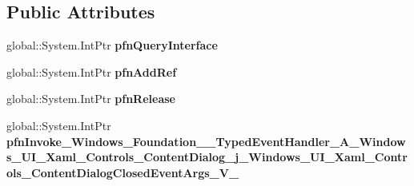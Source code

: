 \subsection*{Public Attributes}
\begin{DoxyCompactItemize}
\item 
\mbox{\label{struct_windows_1_1_foundation_1_1_typed_event_handler___a___windows___u_i___xaml___controls___co7a2cb13f58867dd2ebe18aa3ab56ee61_a63d3bc9447dea6fc4658a59597adfc0b}} 
global\+::\+System.\+Int\+Ptr {\bfseries pfn\+Query\+Interface}
\item 
\mbox{\label{struct_windows_1_1_foundation_1_1_typed_event_handler___a___windows___u_i___xaml___controls___co7a2cb13f58867dd2ebe18aa3ab56ee61_aba7b386aee59543ed807b7e733407ffd}} 
global\+::\+System.\+Int\+Ptr {\bfseries pfn\+Add\+Ref}
\item 
\mbox{\label{struct_windows_1_1_foundation_1_1_typed_event_handler___a___windows___u_i___xaml___controls___co7a2cb13f58867dd2ebe18aa3ab56ee61_a89e876238bc115e9acc5ea29f9e8cdfe}} 
global\+::\+System.\+Int\+Ptr {\bfseries pfn\+Release}
\item 
\mbox{\label{struct_windows_1_1_foundation_1_1_typed_event_handler___a___windows___u_i___xaml___controls___co7a2cb13f58867dd2ebe18aa3ab56ee61_a39d66d32523f11c74371da3e1368730c}} 
global\+::\+System.\+Int\+Ptr {\bfseries pfn\+Invoke\+\_\+\+Windows\+\_\+\+Foundation\+\_\+\+\_\+\+Typed\+Event\+Handler\+\_\+\+A\+\_\+\+Windows\+\_\+\+U\+I\+\_\+\+Xaml\+\_\+\+Controls\+\_\+\+Content\+Dialog\+\_\+j\+\_\+\+Windows\+\_\+\+U\+I\+\_\+\+Xaml\+\_\+\+Controls\+\_\+\+Content\+Dialog\+Closed\+Event\+Args\+\_\+\+V\+\_\+}
\end{DoxyCompactItemize}
